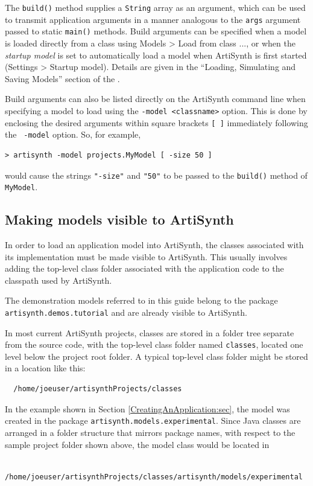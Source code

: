 The {\tt build()} method supplies a {\tt String} array as an argument,
which can be used to transmit application arguments in a manner
analogous to the {\tt args} argument passed to static {\tt main()}
methods. Build arguments can be specified when a model is loaded
directly from a class using {\sf Models > Load from class ...}, or when
the {\it startup model} is set to automatically load a model
when ArtiSynth is first started ({\sf Settings > Startup
model}). Details are given in the ``Loading, Simulating and
Saving Models'' section of the
.

Build arguments can also be listed directly on the ArtiSynth command
line when specifying a model to load using the {\tt -model
<classname>} option.  This is done by enclosing the desired arguments
within square brackets {\tt [ ]} immediately following the {\tt
-model} option. So, for example,
%
\begin{verbatim}
> artisynth -model projects.MyModel [ -size 50 ]
\end{verbatim}
%
would cause the strings {\tt "-size"} and {\tt "50"} to
be passed to the {\tt build()} method of {\tt MyModel}.

\subsection{Making models visible to ArtiSynth}

In order to load an application model into ArtiSynth, the classes
associated with its implementation must be made visible to ArtiSynth.
This usually involves adding the top-level class folder associated
with the application code to the classpath used by ArtiSynth.

\begin{sideblock}
The demonstration models referred to in this guide belong to the
package {\tt artisynth.demos.tutorial} and are already visible to
ArtiSynth.
\end{sideblock}

In most current ArtiSynth projects, classes are stored in
a folder tree separate from the source code, with the top-level
class folder named {\tt classes}, located one level below
the project root folder. A typical top-level class folder
might be stored in a location like this:
\begin{verbatim}
  /home/joeuser/artisynthProjects/classes
\end{verbatim}
In the example shown in Section \ref{CreatingAnApplication:sec}, the
model was created in the package {\tt artisynth.models.experimental}.
Since Java classes are arranged in a folder structure that mirrors
package names, with respect to the sample project folder shown
above, the model class would be located in
\begin{verbatim}
  /home/joeuser/artisynthProjects/classes/artisynth/models/experimental
\end{verbatim}

